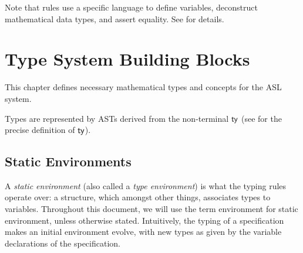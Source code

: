 \documentclass{book}
\begin{document}
Note that rules use a specific language to define variables, deconstruct mathematical data types,
and assert equality. See  for details.



\chapter{Type System Building Blocks}
\label{chap:typesystembuildingblocks}
This chapter defines necessary mathematical types and concepts for the ASL system.

Types are represented by ASTs derived from the non-terminal $\textsf{ty}$ (see \cite{ASLAbstractSyntaxReference}
for the precise definition of $\textsf{ty}$).

\section{Static Environments}

A \emph{static environment} (also called a \emph{type environment}) is what the typing rules operate over:
a structure, which amongst other things, associates types to variables.
Throughout this document, we will use the term environment for static environment, unless otherwise stated.
Intuitively, the typing of a
specification makes an initial environment evolve, with new types as given by the
variable declarations of the specification.
\end{document}

